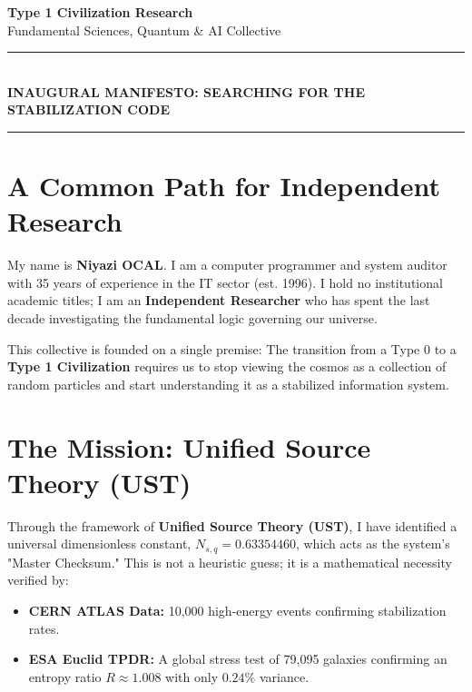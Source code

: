 \documentclass[11pt,a4paper]{article}
\begin{document}
\begin{center}
    \textbf{\huge Type 1 Civilization Research} \\
    \vspace{0.2cm}
    \large Fundamental Sciences, Quantum \& AI Collective \\
    \vspace{0.5cm}
    \rule{\linewidth}{0.2mm} \\
    \vspace{0.3cm}
    \textbf{INAUGURAL MANIFESTO: SEARCHING FOR THE STABILIZATION CODE} \\
    \rule{\linewidth}{0.2mm}
\end{center}

\vspace{0.5cm}

\section*{A Common Path for Independent Research}
My name is \textbf{Niyazi OCAL}. I am a computer programmer and system auditor with 35 years of experience in the IT sector (est. 1996). I hold no institutional academic titles; I am an \textbf{Independent Researcher} who has spent the last decade investigating the fundamental logic governing our universe.

This collective is founded on a single premise: The transition from a Type 0 to a \textbf{Type 1 Civilization} requires us to stop viewing the cosmos as a collection of random particles and start understanding it as a stabilized information system.

\section*{The Mission: Unified Source Theory (UST)}
Through the framework of \textbf{Unified Source Theory (UST)}, I have identified a universal dimensionless constant, $N_{s,q} = 0.63354460$, which acts as the system's "Master Checksum." This is not a heuristic guess; it is a mathematical necessity verified by:
\begin{itemize}
    \item \textbf{CERN ATLAS Data:} 10,000 high-energy events confirming stabilization rates.
    \item \textbf{ESA Euclid TPDR:} A global stress test of 79,095 galaxies confirming an entropy ratio $R \approx 1.008$ with only $0.24\%$ variance.
\end{itemize}
\end{document}
